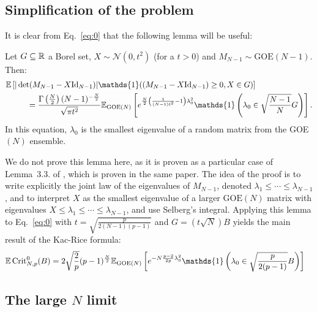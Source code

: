 \documentclass[amsmath,amssymb,nofootinbib,prd]{article}
\begin{document}
	\subsection{Simplification of the problem}
	
	It is clear from Eq.~\ref{eq:0} that the following lemma will be useful:
	\begin{lemma}\label{lemma:simplification} Let $G \subseteq \mathbb{R}$ a Borel set, $X \sim \mathcal{N}(0,t^2)$ (for a $t > 0$) and $M_{N-1} \sim \mathrm{GOE}(N-1)$. Then:
	\begin{align}
	\EE &\left[|\det (M_{N-1} - X \mathrm{Id}_{N-1})| \mathds{1}( (M_{N-1} - X \mathrm{Id}_{N-1}) \geq 0, X \in G)\right] \nonumber \\
	&\qquad = \frac{\Gamma\left(\frac{N}{2}\right)(N-1)^{-\frac{N}{2}}}{\sqrt{\pi t^2}} \EE_{\mathrm{GOE}(N)} \left[e^{\frac{N}{2}\left(\frac{1}{(N-1)t^2} - 1\right) \lambda_0^2} \mathds{1} \left(\lambda_0 \in \sqrt{\frac{N-1}{N}} G\right)\right].
	\end{align}
	In this equation, $\lambda_0$ is the smallest eigenvalue of a random matrix from the GOE$(N)$ ensemble. 
	\end{lemma}

	We do not prove this lemma here, as it is proven as a particular case of Lemma~3.3. of \cite{auffinger2013random}, which is proven in the same paper. The idea of the proof is to write explicitly the joint law of the eigenvalues of $M_{N-1}$, denoted $\lambda_1 \leq \cdots \leq \lambda_{N-1}$, and to interpret $X$ as the smallest eigenvalue of a larger $\mathrm{GOE}(N)$ matrix with eigenvalues $X \leq \lambda_1 \leq \cdots \leq \lambda_{N-1}$, and use Selberg's integral.  Applying this lemma to Eq.~\ref{eq:0} with $t = \sqrt{\frac{p}{2 (N-1)(p-1)}}$ and  $G = (t\sqrt{N}) B$ yields the main result of the Kac-Rice formula:
	\begin{align}\label{eq:1}
	\EE \, \mathrm{Crit}_{N,p}^0(B) &= 2 \sqrt{\frac{2}{p}} (p-1)^{\frac{N}{2}} \EE_{\mathrm{GOE}(N)} \left[e^{-N \frac{p-2}{2p} \lambda_0^2} \mathds{1} \left(\lambda_0 \in  \sqrt{\frac{p}{2(p-1)}} B\right)\right]
\end{align}		
	
	
	\subsection{The large $N$ limit}
	
\end{document}
